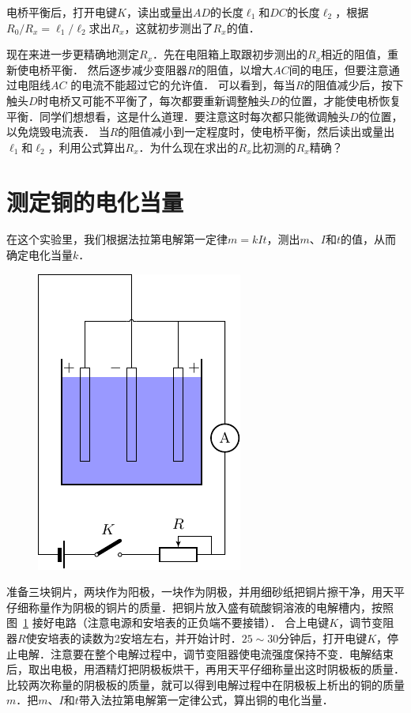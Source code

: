 电桥平衡后，打开电键$K$，读出或量出$AD$的长度$\ell_1$和$DC$的长度$\ell_2$，根据$R_0/R_x=\ell_1/\ell_2$求出$R_x$，这就初步测出了$R_x$的值．

现在来进一步更精确地测定$R_x$．先在电阻箱上取跟初步测出的$R_x$相近的阻值，重新使电桥平衡．
然后逐步减少变阻器$R$的阻值，以增大$AC$间的电压，但要注意通过电阻线$AC$
的电流不能超过它的允许值．
可以看到，每当$R$的阻值减少后，按下触头$D$时电桥又可能不平衡了，每次都要重新调整触头$D$的位置，才能使电桥恢复平衡．同学们想想看，这是什么道理．要注意这时每次都只能微调触头$D$的位置，以免烧毁电流表．
当$R$的阻值减小到一定程度时，使电桥平衡，然后读出或量出$\ell_1$和$\ell_2$，利用公式算出$R_x$．为什么现在求出的$R_x$比初测的$R_x$精确？

\section{测定铜的电化当量}
在这个实验里，我们根据法拉第电解第一定律$m=kIt$，测出$m$、$I$和$t$的值，从而确定电化当量$k$．
\begin{figure}[htbp]
    \centering
    \includegraphics{fig/B/9-12.pdf}
    \caption{}\label{fig_B_9-12}
\end{figure}

准备三块铜片，两块作为阳极，一块作为阴极，并用细砂纸把铜片擦干净，用天平仔细称量作为阴极的铜片的质量．把铜片放入盛有硫酸铜溶液的电解槽内，按照图~\ref{fig_B_9-12} 接好电路（注意电源和安培表的正负端不要接错）．
合上电键$K$，调节变阻器$R$使安培表的读数为2安培左右，并开始计时．$25 \sim 30$分钟后，打开电键$K$，停止电解．注意要在整个电解过程中，调节变阻器使电流强度保持不变．电解结束后，取出电极，用酒精灯把阴极板烘干，再用天平仔细称量出这时阴极板的质量．
比较两次称量的阴极板的质量，就可以得到电解过程中在阴极板上析出的铜的质量$m$．把$m$、$I$和$t$带入法拉第电解第一定律公式，算出铜的电化当量．

